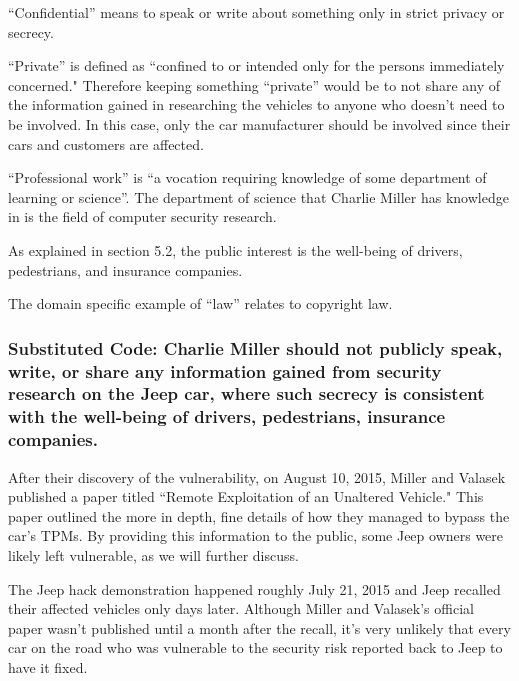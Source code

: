 \documentclass[12pt]{article}
\begin{document}
\begin{multicols}{2}
``Confidential'' means to speak or write about something only in strict privacy or secrecy.\cite{dictionary}

``Private'' is defined as ``confined to or intended only for the persons immediately concerned."\cite{dictionary} Therefore keeping something ``private'' would be to not share any of the information gained in researching the vehicles to anyone who doesn't need to be involved. In this case, only the car manufacturer should be involved since their cars and customers are affected. 

``Professional work'' is ``a vocation requiring knowledge of some department of learning or science''\cite{dictionary}. The department of science that Charlie Miller has knowledge in is the field of computer security research. 

As explained in section 5.2, the public interest is the well-being of drivers, pedestrians, and insurance companies.

The domain specific example of ``law'' relates to copyright law. %


\subsubsection{Substituted Code: Charlie Miller should not publicly speak, write, or share any information gained from security research on the Jeep car, where such secrecy is consistent with the well-being of drivers, pedestrians, insurance companies.}



After their discovery of the vulnerability, on August 10, 2015, Miller and Valasek published a paper titled ``Remote Exploitation of an Unaltered Vehicle."\cite{officialPaper} This paper outlined the more in depth, fine details of how they managed to bypass the car's TPMs. By providing this information to the public, some Jeep owners were likely left vulnerable, as we will further discuss.


The Jeep hack demonstration happened roughly July 21, 2015\cite{wired} and Jeep recalled their affected vehicles only days later.\cite{recall} Although Miller and Valasek's official paper wasn't published until a month after the recall, it's very unlikely that every car on the road who was vulnerable to the security risk reported back to Jeep to have it fixed. 


\end{multicols}
\end{document}
